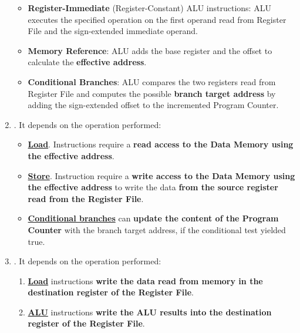 \begin{enumerate}
\begin{itemize}
        \item \textbf{Register-Immediate} (Register-Constant) ALU instructions: ALU executes the specified operation on the first operand read from Register File and the sign-extended immediate operand.

        \item \textbf{Memory Reference}: ALU adds the base register and the offset to calculate the \textbf{effective address}.

        \item \textbf{Conditional Branches}: ALU compares the two registers read from Register File and computes the possible \textbf{branch target address} by adding the sign-extended offset to the incremented Program Counter.
    \end{itemize}

    \item {}. It depends on the operation performed:
    \begin{itemize}
        \item \underline{\textbf{Load}}. Instructions require a \textbf{read access to the Data Memory using the effective address}.

        \item \underline{\textbf{Store}}. Instruction require a \textbf{write access to the Data Memory using the effective address} to write the data \textbf{from the source register read from the Register File}.

        \item \underline{\textbf{Conditional branches}} can \textbf{update the content of the Program Counter} with the branch target address, if the conditional test yielded true.
    \end{itemize}

    \newpage

    \item {}. It depends on the operation performed:
    \begin{enumerate}
        \item \underline{\textbf{Load}} instructions \textbf{write the data read from memory in the destination register of the Register File}.

        \item \underline{\textbf{ALU}} instructions \textbf{write the ALU results into the destination register of the Register File}.
    \end{enumerate}
\end{enumerate}

